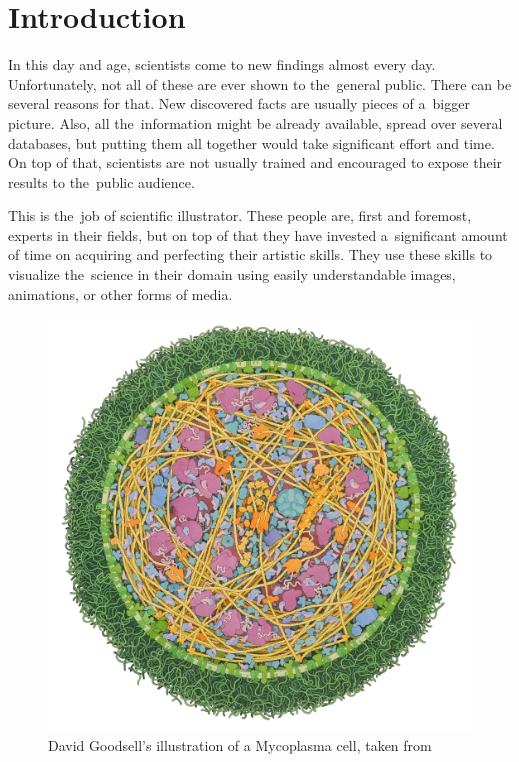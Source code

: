 \documentclass[
  digital, %
  table,   %
  nolof,     %
  nolot,     %
  oneside,
]{fithesis3}
\begin{document}
\chapter{Introduction}
\label{chap:introduction}
In this day and age, scientists come to new findings almost every day. Unfortunately, not all of these are ever shown to the general public. There can be several reasons for that. New discovered facts are usually pieces of a bigger picture. Also, all the information might be already available, spread over several databases, but putting them all together would take significant effort and time.
On top of that, scientists are not usually trained and encouraged to expose their results to the public audience.

This is the job of scientific illustrator. These people are, first and foremost, experts in their fields, but on top of that they have invested a significant amount of time on acquiring and perfecting their artistic skills. They use these skills to visualize the science in their domain using easily understandable images, animations, or other forms of media. %
\begin{figure}
  \centering
  \includegraphics[scale=0.3]{images/goodsell-mycoplasma.jpg}
  \caption{David Goodsell's illustration of a Mycoplasma cell, taken from \cite{goodsellMycoplasma}}
  \label{fig:goodsell-mycoplasma}
\end{figure}
\end{document}
